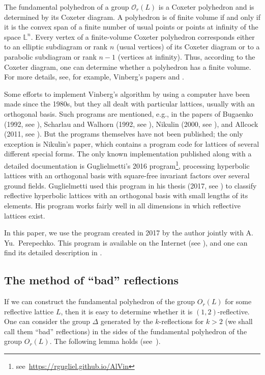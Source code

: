 \documentclass[reqno,12pt]{amsart}
\begin{document}
The fundamental polyhedron of a group $\mathcal{O}_r (L)$ is a Coxeter polyhedron and is
determined by its Coxeter diagram. A polyhedron is of finite volume if and only if it is
the convex span of a finite number of usual points or points at infinity of the space $\mathbb{L}^n$.
Every vertex of a finite-volume Coxeter polyhedron corresponds either to an elliptic subdiagram
or rank $n$ (usual vertices) of its Coxeter diagram or to a parabolic subdiagram
or rank $n-1$ (vertices at infinity). Thus, according to the Coxeter diagram, one can determine
whether a polyhedron has a finite volume. For more details, see, for example, Vinberg's papers
 \cite{Vin67} and \cite{Vin85}.

Some efforts to implement Vinberg's algorithm by using a computer have been made since
the 1980s, but they all dealt with particular lattices, usually with an orthogonal basis.
Such programs are mentioned, e.g., in the papers of Bugaenko (1992, see \cite{Bug92}),
Scharlau and Walhorn (1992, see \cite{SW92}),
Nikulin (2000, see \cite{Nik00}), and Allcock (2011, see \cite{All12}). But the programs
themselves have not been published; the only
exception is Nikulin's paper, which contains a program code for lattices of several different special
forms. The only known implementation published along with a detailed documentation is
Guglielmetti's 2016
program\footnote{see\ \href{https://rgugliel.github.io/AlVin}{https:/\!/rgugliel.github.io/AlVin}},
processing hyperbolic lattices with an orthogonal basis with square-free invariant
factors over several ground fields.
Guglielmetti used this program in his thesis (2017, see \cite{Gug17}) to classify reflective hyperbolic lattices
with an orthogonal basis with small lengths of its elements.
His program works fairly well in all dimensions in which
reflective lattices exist.

In this paper, we use the program created in 2017 by the author jointly with
A.\,Yu.~Perepechko. This program is available on the Internet
(see \cite{VinAlg2017}), and one can find its detailed description in \cite{BP18}.


\subsection{The method of ``bad'' reflections}
\label{ss4.2}

If we can construct the fundamental polyhedron of the group $O_r (L)$
for some reflective lattice $L$, then it is easy to determine whether it is $(1{,}2)$-reflective.
One can consider the group $\Delta$ generated by the $k$-reflections for $k > 2$ (we shall call them
``bad'' reflections)
in the sides of the fundamental polyhedron of the group $O_r (L)$.
The following lemma holds (see~\cite{Vin07}).
\end{document}
